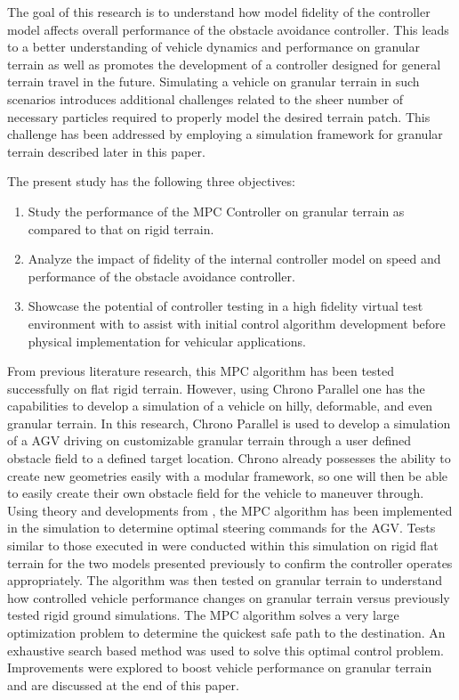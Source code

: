 \documentclass[12pt,onecolumn]{article}
\newcommand{\CHRONO}{{\sffamily{{Chrono}}}}
\begin{document}
The goal of this research is to understand how model fidelity of the controller model affects overall performance of the obstacle avoidance controller. This leads to a better understanding of vehicle dynamics and performance on granular terrain as well as promotes the development of a controller designed for general terrain travel in the future. Simulating a vehicle on granular terrain in such scenarios introduces additional challenges related to the sheer number of necessary particles required to properly model the desired terrain patch. This challenge has been addressed by employing a simulation framework for granular terrain described later in this paper.

The present study has the following three objectives:
\begin{enumerate}
\item
Study the performance of the MPC Controller on granular terrain as compared to that on rigid terrain.
\item
Analyze the impact of fidelity of the internal controller model on speed and performance of the obstacle avoidance controller.
\item
Showcase the potential of controller testing in a high fidelity virtual test environment with {\CHRONO} to assist with initial control algorithm development before physical implementation for vehicular applications.
\end{enumerate}

From previous literature research, this MPC algorithm has been tested successfully on flat rigid terrain. However, using Chrono Parallel one has the capabilities to develop a simulation of a vehicle on hilly, deformable, and even granular terrain. In this research, Chrono Parallel is used to develop a simulation of a AGV driving on customizable granular terrain through a user defined obstacle field to a defined target location. Chrono already possesses the ability to create new geometries easily with a modular framework, so one will then be able to easily create their own obstacle field for the vehicle to maneuver through. Using theory and developments from \cite{ModelFidelity2016}, the MPC algorithm has been implemented in the simulation to determine optimal steering commands for the AGV. Tests similar to those executed in \cite{ModelFidelity2016} were conducted within this simulation on rigid flat terrain for the two models presented previously to confirm the controller operates appropriately. The algorithm was then tested on granular terrain to understand how controlled vehicle performance changes on granular terrain versus previously tested rigid ground simulations. The MPC algorithm solves a very large optimization problem to determine the quickest safe path to the destination. An exhaustive search based method was used to solve this optimal control problem. Improvements were explored to boost vehicle performance on granular terrain and are discussed at the end of this paper.
\end{document}
